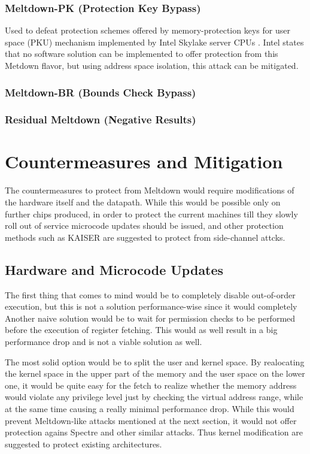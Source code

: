 \documentclass[sigconf]{acmart}
\begin{document}
\subsubsection{Meltdown-PK (Protection Key Bypass)}

Used to defeat protection schemes offered by memory-protection keys for user space (PKU) mechanism implemented by Intel Skylake server CPUs \cite{}. Intel \cite{} states that no software solution can be implemented to offer protection from this Metdown flavor, but using address space isolation, this attack can be mitigated. 

\subsubsection{ Meltdown-BR (Bounds Check Bypass)}



\subsubsection{Residual Meltdown (Negative Results)}

 

\section{Countermeasures and Mitigation}

The countermeasures to protect from Meltdown would require modifications of the hardware itself and the datapath. While this would be possible only on further chips produced, in order to protect the current machines till they slowly roll out of service microcode updates should be issued, and other protection methods such as KAISER \cite{} are suggested to protect from side-channel attcks. 

\subsection{Hardware and Microcode Updates}

The first thing that comes to mind would be to completely disable out-of-order execution, but this is not a solution performance-wise since it would completely 
Another naive solution would be to wait for permission checks to be performed before the execution of register fetching. This would as well result in a big performance drop and is not a viable solution as well. 

The most solid option would be to split the user and kernel space. By realocating the kernel space in the upper part of the memory and the user space on the lower one, it would be quite easy for the fetch to realize whether the memory address would violate any privilege level just by checking the virtual address range, while at the same time causing a really minimal performance drop. While this would prevent Meltdown-like attacks mentioned at the next section, it would not offer protection agains Spectre \cite{} and other similar attacks. Thus kernel modification are suggested to protect existing architectures. 
\end{document}
